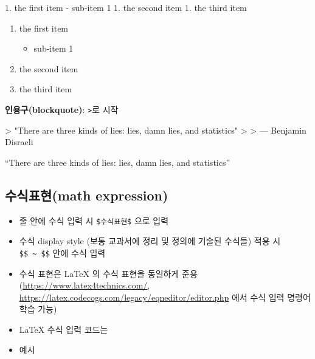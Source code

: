 \documentclass[
  11pt,
]{krantz}
\makeatletter
\newenvironment{Shaded}{\begin{snugshade}}{\end{snugshade}}
\newcommand{\DataTypeTok}[1]{\textcolor[rgb]{0.27,0.27,0.27}{#1}}
\newcommand{\NormalTok}[1]{#1}
\newcommand{\StringTok}[1]{\textcolor[rgb]{0.5,0.5,0.5}{#1}}
\providecommand{\tightlist}{%
  \setlength{\itemsep}{0pt}\setlength{\parskip}{0pt}}
\newenvironment{kframe}{%
\medskip{}
\setlength{\fboxsep}{.8em}
 \def\at@end@of@kframe{}%
 \ifinner\ifhmode%
  \def\at@end@of@kframe{\end{minipage}}%
  \begin{minipage}{\columnwidth}%
 \fi\fi%
 \def\FrameCommand##1{\hskip\@totalleftmargin \hskip-\fboxsep
 \colorbox{shadecolor}{##1}\hskip-\fboxsep
     \hskip-\linewidth \hskip-\@totalleftmargin \hskip\columnwidth}%
 \MakeFramed {\advance\hsize-\width
   \@totalleftmargin\z@ \linewidth\hsize
   \@setminipage}}%
 {\par\unskip\endMakeFramed%
 \at@end@of@kframe}
\renewenvironment{quote}{\begin{kframe}}{\end{kframe}}
\makeatother
\begin{document}
\begin{Shaded}
\begin{Highlighting}[]
\NormalTok{1. }\StringTok{the first item}
\StringTok{   - sub-item 1}
\StringTok{1. the second item}
\StringTok{1. the third item}
\end{Highlighting}
\end{Shaded}

\begin{enumerate}
\def\labelenumi{\arabic{enumi}.}
\tightlist
\item
  the first item

  \begin{itemize}
  \tightlist
  \item
    sub-item 1
  \end{itemize}
\item
  the second item
\item
  the third item
\end{enumerate}

\textbf{인용구(blockquote)}: \texttt{\textgreater{}}로 시작

\begin{Shaded}
\begin{Highlighting}[]
\NormalTok{>}\DataTypeTok{ "There are three kinds of lies: lies, damn lies, and statistics"}
\DataTypeTok{>}
\DataTypeTok{> --- Benjamin Disraeli}
\end{Highlighting}
\end{Shaded}

\begin{quote}
``There are three kinds of lies: lies, damn lies, and statistics''

\end{quote}

\hypertarget{uxc218uxc2dduxd45cuxd604math-expression}{%
\subsection{수식표현(math expression)}\label{uxc218uxc2dduxd45cuxd604math-expression}}

\begin{itemize}
\tightlist
\item
  줄 안에 수식 입력 시 \texttt{\$수식표현\$} 으로 입력
\item
  수식 display style (보통 교과서에 정리 및 정의에 기술된 수식들) 적용 시 \texttt{\$\$\ \textasciitilde{}\ \$\$} 안에 수식 입력
\item
  수식 표현은 LaTeX 의 수식 표현을 동일하게 준용(\url{https://www.latex4technics.com/}, \url{https://latex.codecogs.com/legacy/eqneditor/editor.php} 에서 수식 입력 명령어 학습 가능)
\item
  LaTeX 수식 입력 코드는
\item
  예시
\end{itemize}
\end{document}
